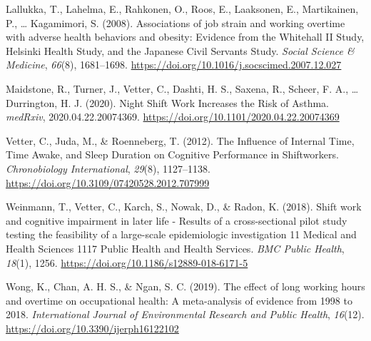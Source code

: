 \documentclass[
  english,
  man]{apa6}
\newlength{\cslhangindent}
\newenvironment{cslreferences}%
  {\setlength{\parindent}{0pt}%
  \everypar{\setlength{\hangindent}{\cslhangindent}}\ignorespaces}%
  {\par}
\begin{document}
\begin{cslreferences}
\leavevmode\hypertarget{ref-Lallukka2008}{}%
Lallukka, T., Lahelma, E., Rahkonen, O., Roos, E., Laaksonen, E., Martikainen, P., \ldots{} Kagamimori, S. (2008). Associations of job strain and working overtime with adverse health behaviors and obesity: Evidence from the Whitehall II Study, Helsinki Health Study, and the Japanese Civil Servants Study. \emph{Social Science \& Medicine}, \emph{66}(8), 1681--1698. \url{https://doi.org/10.1016/j.socscimed.2007.12.027}

\leavevmode\hypertarget{ref-Maidstone2020}{}%
Maidstone, R., Turner, J., Vetter, C., Dashti, H. S., Saxena, R., Scheer, F. A., \ldots{} Durrington, H. J. (2020). Night Shift Work Increases the Risk of Asthma. \emph{medRxiv}, 2020.04.22.20074369. \url{https://doi.org/10.1101/2020.04.22.20074369}

\leavevmode\hypertarget{ref-Vetter2012}{}%
Vetter, C., Juda, M., \& Roenneberg, T. (2012). The Influence of Internal Time, Time Awake, and Sleep Duration on Cognitive Performance in Shiftworkers. \emph{Chronobiology International}, \emph{29}(8), 1127--1138. \url{https://doi.org/10.3109/07420528.2012.707999}

\leavevmode\hypertarget{ref-Weinmann2018}{}%
Weinmann, T., Vetter, C., Karch, S., Nowak, D., \& Radon, K. (2018). Shift work and cognitive impairment in later life - Results of a cross-sectional pilot study testing the feasibility of a large-scale epidemiologic investigation 11 Medical and Health Sciences 1117 Public Health and Health Services. \emph{BMC Public Health}, \emph{18}(1), 1256. \url{https://doi.org/10.1186/s12889-018-6171-5}

\leavevmode\hypertarget{ref-Wong2019}{}%
Wong, K., Chan, A. H. S., \& Ngan, S. C. (2019). The effect of long working hours and overtime on occupational health: A meta-analysis of evidence from 1998 to 2018. \emph{International Journal of Environmental Research and Public Health}, \emph{16}(12). \url{https://doi.org/10.3390/ijerph16122102}
\end{cslreferences}

\endgroup
\end{document}
